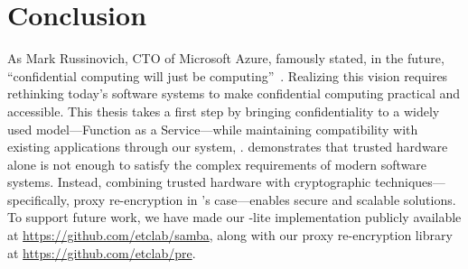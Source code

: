 \section{Conclusion}
\label{sec:conclusion}

As Mark Russinovich, CTO of Microsoft Azure, famously stated, in the future,
``confidential computing will just be
computing''~\cite{23-acm_queue-confidential_computing}.
%
Realizing this vision requires rethinking today's software systems to make
confidential computing practical and accessible.
%
This thesis takes a first step by bringing confidentiality to a widely used
model---Function as a Service---while maintaining compatibility with existing
applications through our system, \SystemName.
%
\SystemName demonstrates that trusted hardware alone is not enough to satisfy
the complex requirements of modern software systems.
%
Instead, combining trusted hardware with cryptographic
techniques---specifically, proxy re-encryption in \SystemName's case---enables
secure and scalable solutions.
%
To support future work, we have made our \SystemName-lite implementation
publicly available at \url{https://github.com/etclab/samba}, along with our
proxy re-encryption library at \url{https://github.com/etclab/pre}.






